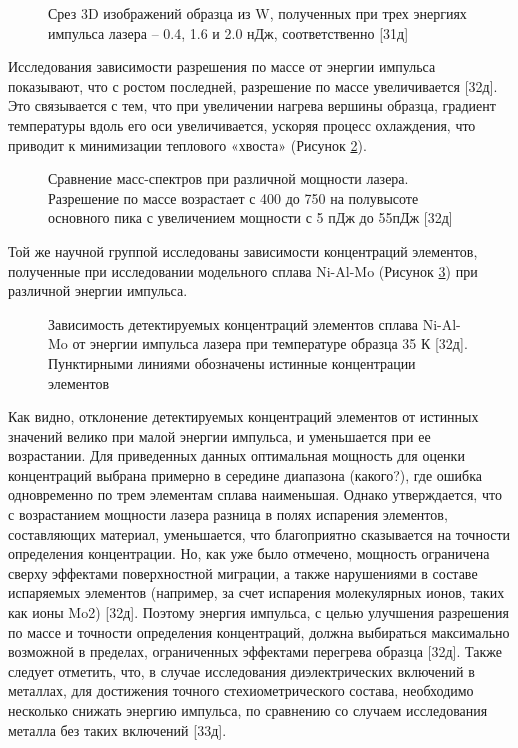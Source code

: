 \begin{figure}[htb]
	\caption{Срез 3D изображений образца из W, полученных при трех энергиях импульса лазера – 0.4, 1.6 и 2.0 нДж, соответственно [31д]}
	\label{fig:ParamsEnergy}
\end{figure}

Исследования зависимости разрешения по массе от энергии импульса показывают, что с ростом последней, разрешение по массе увеличивается [32д]. Это связывается с тем, что при увеличении нагрева вершины образца, градиент температуры вдоль его оси увеличивается, ускоряя процесс охлаждения, что приводит к минимизации теплового «хвоста» (Рисунок \cref{fig:ParamsPower}).

\begin{figure}[htb]
	\caption{Сравнение масс-спектров при различной мощности лазера. Разрешение по массе возрастает с 400 до 750 на полувысоте основного пика с увеличением мощности с 5 пДж до 55пДж [32д] }
	\label{fig:ParamsPower}
\end{figure}

Той же научной группой исследованы зависимости концентраций элементов, полученные при исследовании модельного сплава Ni-Al-Mo (Рисунок \cref{fig:ParamsComposition}) при различной энергии импульса.

\begin{figure}[htb]
	\caption{Зависимость детектируемых концентраций элементов сплава Ni-Al-Mo от энергии импульса лазера при температуре образца 35 К [32д]. Пунктирными линиями обозначены истинные концентрации элементов}
	\label{fig:ParamsComposition}
\end{figure}

Как видно, отклонение детектируемых концентраций элементов от истинных значений велико при малой энергии импульса, и уменьшается при ее возрастании. Для приведенных данных оптимальная мощность для оценки концентраций выбрана примерно в середине диапазона (какого?), где ошибка одновременно по трем элементам сплава наименьшая. Однако утверждается, что с возрастанием мощности лазера разница в полях испарения элементов, составляющих материал, уменьшается, что благоприятно сказывается на точности определения концентрации. Но, как уже было отмечено, мощность ограничена сверху эффектами поверхностной миграции, а также нарушениями в составе испаряемых элементов (например, за счет испарения молекулярных ионов, таких как ионы Mo2) [32д]. Поэтому энергия импульса, с целью улучшения разрешения по массе и точности определения концентраций, должна выбираться максимально возможной в пределах, ограниченных эффектами перегрева образца [32д]. Также следует отметить, что, в случае исследования диэлектрических включений в металлах, для достижения точного стехиометрического состава, необходимо несколько снижать энергию импульса, по сравнению со случаем исследования металла без таких включений [33д].

